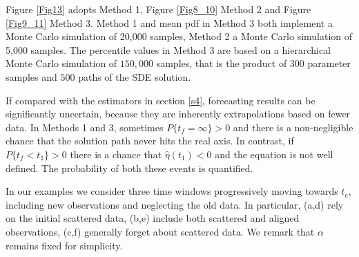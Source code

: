 \documentclass{article}
\begin{document}
Figure \ref{Fig13} adopts Method 1, Figure \ref{Fig8_10} Method 2 and Figure \ref{Fig9_11} Method 3. Method 1 and mean pdf in Method 3 both implement a Monte Carlo simulation of 20,000 samples, Method 2 a Monte Carlo simulation of 5,000 samples. The percentile values in Method 3 are based on a hierarchical Monte Carlo simulation of $150,000$ samples, that is the product of $300$ parameter samples and $500$ paths of the SDE solution.

If compared with the estimators in section \ref{s4}, forecasting results can be significantly uncertain, because they are inherently extrapolations based on fewer data. In Methods 1 and 3, sometimes $P\{t_f=\infty\} >0$ and there is a non-negligible chance that the solution path never hits the real axis. In contrast, if $P\{t_f<t_1\} >0$ there is a chance that $\hat\eta(t_1)<0$ and the equation is not well defined. The probability of both these events is quantified.

In our examples we consider three time windows progressively moving towards $t_e$, including new observations and neglecting the old data. In particular, (a,d) rely on the initial scattered data, (b,e) include both scattered and aligned observations, (c,f) generally forget about scattered data. We remark that $\alpha$ remains fixed for simplicity.
\end{document}
